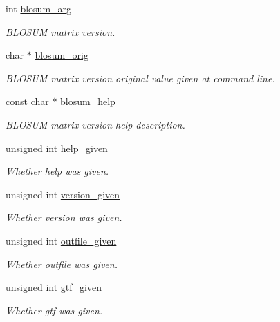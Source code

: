 \begin{DoxyCompactItemize}
int \hyperlink{structgengetopt__args__info_a7d3c9030b97320380911d603e2130e0d}{blosum\+\_\+arg}
\begin{DoxyCompactList}\small\item\em B\+L\+O\+S\+UM matrix version. \end{DoxyCompactList}\item 
char $\ast$ \hyperlink{structgengetopt__args__info_a93a262b5d97dda58b75849a1318e2918}{blosum\+\_\+orig}
\begin{DoxyCompactList}\small\item\em B\+L\+O\+S\+UM matrix version original value given at command line. \end{DoxyCompactList}\item 
\hyperlink{getopt_8c_a2c212835823e3c54a8ab6d95c652660e}{const} char $\ast$ \hyperlink{structgengetopt__args__info_a6527f32b39a7c09ee3daffe899887075}{blosum\+\_\+help}
\begin{DoxyCompactList}\small\item\em B\+L\+O\+S\+UM matrix version help description. \end{DoxyCompactList}\item 
unsigned int \hyperlink{structgengetopt__args__info_ab9fd677f890731fd7d6f6c62e6dfc99c}{help\+\_\+given}
\begin{DoxyCompactList}\small\item\em Whether help was given. \end{DoxyCompactList}\item 
unsigned int \hyperlink{structgengetopt__args__info_ad4953a2130b2f8b94a3a687014f278e1}{version\+\_\+given}
\begin{DoxyCompactList}\small\item\em Whether version was given. \end{DoxyCompactList}\item 
unsigned int \hyperlink{structgengetopt__args__info_af6f058929187956cb68a0192b866f942}{outfile\+\_\+given}
\begin{DoxyCompactList}\small\item\em Whether outfile was given. \end{DoxyCompactList}\item 
unsigned int \hyperlink{structgengetopt__args__info_a0e6e111149cf2a4bc171c80ee4055f8e}{gtf\+\_\+given}
\begin{DoxyCompactList}\small\item\em Whether gtf was given. \end{DoxyCompactList}\item 

\end{DoxyCompactItemize}
